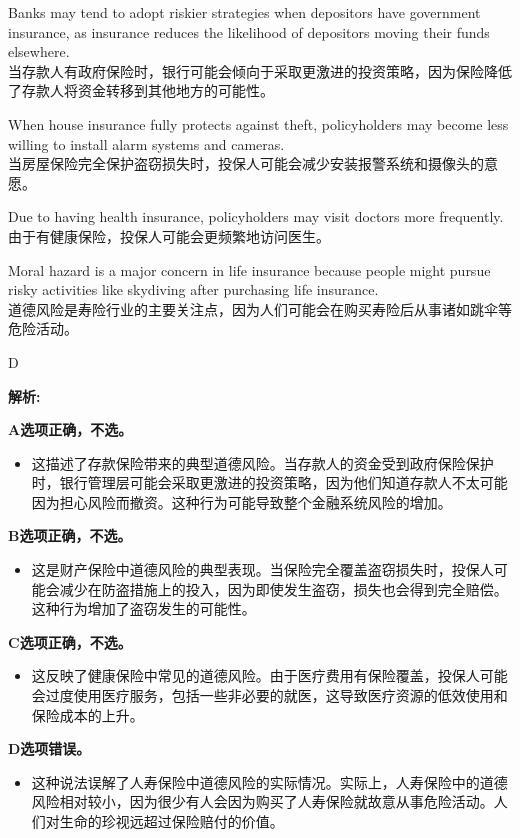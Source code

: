 \documentclass{article}
\newenvironment{explanation}
{\textbf{解析:}\par}
{\par}
\begin{document}
\begin{choices}
    \item Banks may tend to adopt riskier strategies when depositors have government insurance, as insurance reduces the likelihood of depositors moving their funds elsewhere.\\
    当存款人有政府保险时，银行可能会倾向于采取更激进的投资策略，因为保险降低了存款人将资金转移到其他地方的可能性。
    \item When house insurance fully protects against theft, policyholders may become less willing to install alarm systems and cameras.\\当房屋保险完全保护盗窃损失时，投保人可能会减少安装报警系统和摄像头的意愿。
    \item Due to having health insurance, policyholders may visit doctors more frequently.\\由于有健康保险，投保人可能会更频繁地访问医生。
    \item Moral hazard is a major concern in life insurance because people might pursue risky activities like skydiving after purchasing life insurance.\\道德风险是寿险行业的主要关注点，因为人们可能会在购买寿险后从事诸如跳伞等危险活动。
\end{choices}

\begin{correctanswer}
    D
\end{correctanswer}

\begin{explanation}
    \textbf{A选项正确，不选。}
    \begin{itemize}
        \item 这描述了存款保险带来的典型道德风险。当存款人的资金受到政府保险保护时，银行管理层可能会采取更激进的投资策略，因为他们知道存款人不太可能因为担心风险而撤资。这种行为可能导致整个金融系统风险的增加。
    \end{itemize}

    \textbf{B选项正确，不选。}
    \begin{itemize}
        \item 这是财产保险中道德风险的典型表现。当保险完全覆盖盗窃损失时，投保人可能会减少在防盗措施上的投入，因为即使发生盗窃，损失也会得到完全赔偿。这种行为增加了盗窃发生的可能性。
    \end{itemize}

    \textbf{C选项正确，不选。}
    \begin{itemize}
        \item 这反映了健康保险中常见的道德风险。由于医疗费用有保险覆盖，投保人可能会过度使用医疗服务，包括一些非必要的就医，这导致医疗资源的低效使用和保险成本的上升。
    \end{itemize}

    \textbf{D选项错误。}
    \begin{itemize}
        \item 这种说法误解了人寿保险中道德风险的实际情况。实际上，人寿保险中的道德风险相对较小，因为很少有人会因为购买了人寿保险就故意从事危险活动。人们对生命的珍视远超过保险赔付的价值。
    \end{itemize}
\end{explanation}
\end{document}
